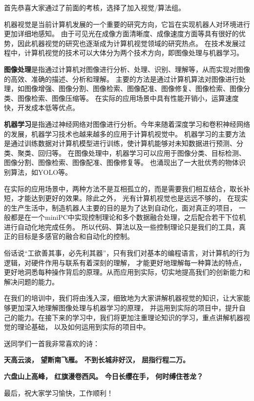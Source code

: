 首先恭喜大家通过了前面的考核，选择了加入视觉/算法组。   

机器视觉是当前计算机发展的一个重要的研究方向，它旨在实现机器人对环境进行更加详细地感知。
由于可见光在成像方面清晰度、成像速度方面等具有很好的优势，因此机器视觉的研究也逐渐成为计算机视觉领域的研究热点。
在技术发展过程中，计算机视觉的技术可以大体分为两个技术方向，即图像处理与机器学习。

\textbf{图像处理}是指通过计算机对图像进行分析、处理、识别、理解等，从而实现对图像的高效、准确的描述、分析和理解。
主要的方法是通过计算机算法对图像进行处理，如图像增强、图像分割、图像检索、图像配准、图像修复、图像检索、图像分类、图像检索、图像压缩等。
在实际的应用场景中具有性能开销小，运算速度快，开发成本低等优点。

\textbf{机器学习}是指通过神经网络对图像进行分析。今年来随着深度学习和卷积神经网络的发展，机器学习技术也越来越多的应用于计算机视觉中。
机器学习的主要方法是通过训练数据对计算机模型进行训练，使计算机能够对未知数据进行预测、分类、聚类、回归等。
在图像处理中，机器学习可以应用于图像分类、目标检测、图像分割、图像检索、图像配准、图像修复等。
也涌现出了一大批优秀的物体识别算法，如YOLO等。

在实际的应用场景中，两种方法不是互相孤立的，而是需要我们相互结合，取长补短，才能达到更好的效果。除此之外，
光有计算机视觉也是远远不够的，
在现实的生产生活中，制造机器人主要的目的是为了达到自动化，面对真正的项目，
一般都是在一个miniPC中实现控制理论和多个数据融合处理，之后配合若干下位机进行自动化地完成任务。
所以代码、算法以及一些控制理论只是我们的工具，真正的目标是多感官的融合和自动化的控制。

俗话说“工欲善其事，必先利其器”，只有我们对基本的编程语言，对计算机的行为逻辑，对硬件作用与联系有着深刻的理解，
才能更好地理解每一种算法的特点，更好地洞悉每种操作背后的原理。从而应用到实际，切实地提高我们的创新能力和解决问题的能力。

在我们的培训中，我们将由浅入深，细致地为大家讲解机器视觉的知识，让大家能够更加深入地理解图像处理与机器学习的原理，
并运用到实际的项目中，提升自己的能力。在接下来的学习中，我们将更加注重理论知识的学习，重点讲解机器视觉的理论基础，
以及如何运用到实际的项目中。

送同学们一首我非常喜欢的诗：

\textbf{天高云淡， 望断南飞雁。 不到长城非好汉， 屈指行程二万。} 

\textbf{六盘山上高峰， 红旗漫卷西风。 今日长缨在手， 何时缚住苍龙？}

最后，祝大家学习愉快，工作顺利！
